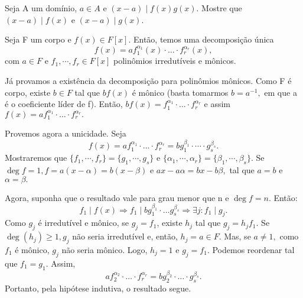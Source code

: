 \documentclass[algebraII_notes.tex]{subfiles}
\begin{document}
\begin{example}[Exercício]
	Seja A um domínio, \(a\in A\) e \((x-a)\mid f(x)g(x).\) Mostre que \((x-a)\mid f(x)\) e \((x-a)\mid g(x).\)
\end{example}
\begin{prop*}
	Seja F um corpo e \(f(x)\in F[x]\). Então, temos uma decomposição única
	\[
		f(x) = af_{1}^{\alpha_{1}}(x)\cdot \dotsc \cdot f_{r}^{\alpha_{r}}(x),
	\]
	com \(a\in F\) e \(f_{1}, \cdots, f_{r}\in F[x]\) polinômios irredutíveis e mônicos.
\end{prop*}
\begin{proof*}
	Já provamos a existência da decomposição para polinômios mônicos. Como F é corpo, existe \(b\in F\) tal que
	\(bf(x)\) é mônico (basta tomarmos \(b=a^{-1},\) em que a é o coeficiente líder de f). Então, \(bf(x) = f_{1}^{\alpha_{1}}\cdot \dotsc \cdot f_{r}^{\alpha_{r}}\)
	e assim \(f(x) =af_{1}^{\alpha_{1}}\cdot \dotsc \cdot f_{r}^{\alpha_{r}}.\)

	Provemos agora a unicidade. Seja
	\[
		f(x)=af_{1}^{\alpha_{1}} \cdot \dotsc \cdot f_{r}^{\alpha_{r}} = bg_{1}^{\beta_{1}} \cdot \cdots \cdot g_{s}^{\beta_{s}}.
	\]
	Mostraremos que \(\{f_{1}, \cdots, f_{r}\} = \{g_{1}, \cdots, g_{s}\}\) e \(\{\alpha_{1}, \cdots, \alpha_{r}\} = \{\beta_{1}, \cdots, \beta_{s}\}\).
	Se \(\deg{f} = 1, f = a(x-\alpha ) = b(x-\beta )\) e \(ax -a\alpha =bx - b\beta,\) tal que \(a=b\) e \(\alpha =\beta .\)

	Agora, suponha que o resultado vale para grau menor que n e \(\deg{f} = n.\) Então:
	\[
		f_{1}\mid f(x) \Rightarrow f_{1}\mid bg_{1}^{\beta_{1}}\cdot \dotsc g_{s}^{\beta_{s}} \Rightarrow \exists j: f_{1}\mid g_{j}.
	\]
	Como \(g_{j}\) é irredutível e mônico, se \(g_{j}=f_{1}\), existe \(h_{j}\) tal que \(g_{j} = h_{j}f_{1}.\) Se \(\deg{(h_{j})}\geq 1, g_{j}\) não seria
	irredutível e, então, \(h_{j} = a\in F.\) Mas, se \(a\neq1,\) como \(f_{1}\) é mônico, \(g_{j}\) não seria mônico. Logo, \(h_{j} = 1\) e \(g_{j} = f_{1}.\)
	Podemos reordenar tal que \(f_{1} = g_{1}. \) Assim,
	\[
		af_{2}^{\alpha_{2}}\cdot \dotsc \cdot f_{r}^{\alpha_{r}} = bg_{2}^{\beta_{2}} \cdot \dotsc \cdot g_{s}^{\beta_{s}}.
	\]
	Portanto, pela hipótese indutiva, o resultado segue. \qedsymbol
\end{proof*}
\end{document}
